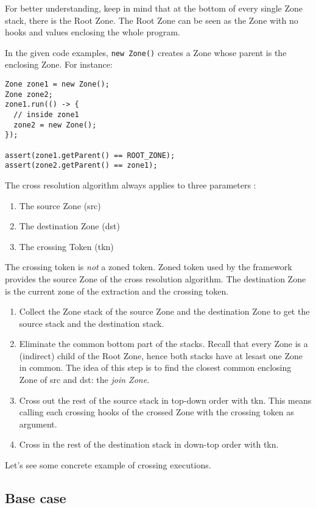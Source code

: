 For better understanding, keep in mind that at the bottom of every single Zone stack, there is the Root Zone. The Root Zone can be seen as the Zone with no hooks and values enclosing the whole program.

In the given code examples, \lstinline{new Zone()} creates a Zone whose parent is the enclosing Zone. For instance:

\begin{lstlisting}
Zone zone1 = new Zone();
Zone zone2;
zone1.run(() -> {
  // inside zone1
  zone2 = new Zone();
});

assert(zone1.getParent() == ROOT_ZONE);
assert(zone2.getParent() == zone1);
\end{lstlisting}

The cross resolution algorithm always applies to three parameters :

\begin{enumerate}
\item The source Zone (src)
\item The destination Zone (dst)
\item The crossing Token (tkn)
\end{enumerate}

The crossing token is \emph{not} a zoned token. Zoned token used by the framework provides the source Zone of the cross resolution algorithm. The destination Zone is the current zone of the extraction and the crossing token.

\begin{enumerate}
\item Collect the Zone stack of the source Zone and the destination Zone to get the source stack and the destination stack.
\item Eliminate the common bottom part of the stacks. Recall that every Zone is a (indirect) child of the Root Zone, hence both stacks have at lesast one Zone in common. The idea of this step is to find the closest common enclosing Zone of src and dst: the \emph{join Zone}.
\item Cross out the rest of the source stack in top-down order with tkn. This means calling each crossing hooks of the crossed Zone with the crossing token as argument.
\item Cross in the rest of the destination stack in down-top order with tkn.
\end{enumerate}

Let's see some concrete example of crossing executions.

\subsection*{Base case}

